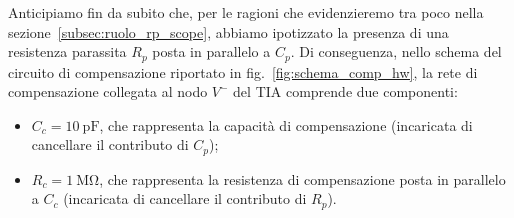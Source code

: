 \documentclass[11pt,a4paper]{article}
\begin{document}
Anticipiamo fin da subito che, per le ragioni che evidenzieremo tra poco nella sezione~\ref{subsec:ruolo_rp_scope}, abbiamo ipotizzato la presenza di una resistenza parassita $R_p$ posta in parallelo a $C_p$. Di conseguenza, nello schema del circuito di compensazione riportato in fig.~\ref{fig:schema_comp_hw}, la rete di compensazione collegata al nodo $V^-$ del TIA comprende due componenti:
\begin{itemize}
    \item $C_c = \SI{10}{\pico\farad}$, che rappresenta la capacità di compensazione (incaricata di cancellare il contributo di $C_p$);
    \item $R_c = \SI{1}{\mega\ohm}$, che rappresenta la resistenza di compensazione posta in parallelo a $C_c$ (incaricata di cancellare il contributo di $R_p$).
\end{itemize}
\end{document}

